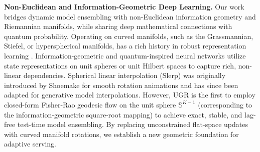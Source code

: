 \textbf{Non-Euclidean and Information-Geometric Deep Learning.}
Our work bridges dynamic model ensembling with non-Euclidean information geometry and Riemannian manifolds, while sharing deep mathematical connections with quantum probability. Operating on curved manifolds, such as the Grassmannian, Stiefel, or hyperspherical manifolds, has a rich history in robust representation learning \cite{gong2014multi}. Information-geometric and quantum-inspired neural networks utilize state representations on unit spheres or unit Hilbert spaces to capture rich, non-linear dependencies. Spherical linear interpolation (Slerp) was originally introduced by Shoemake \cite{shoemake1985animating} for smooth rotation animations and has since been adapted for generative model interpolations. However, UGR is the first to employ closed-form Fisher-Rao geodesic flow on the unit sphere $\mathbb{S}^{K-1}$ (corresponding to the information-geometric square-root mapping) to achieve exact, stable, and lag-free test-time model ensembling. By replacing unconstrained flat-space updates with curved manifold rotations, we establish a new geometric foundation for adaptive serving.
